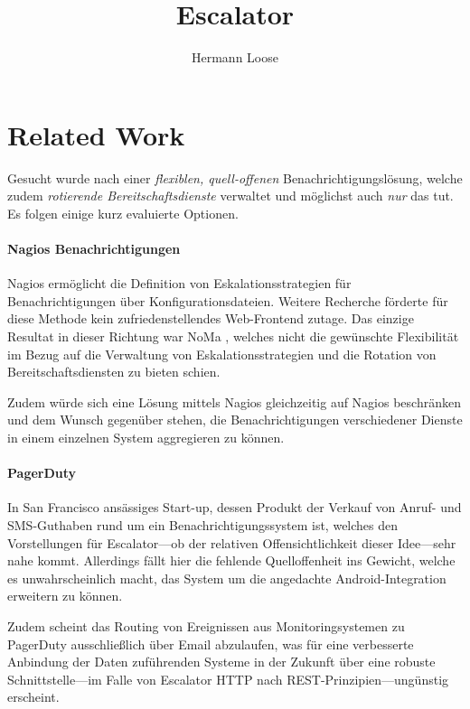 \documentclass[11pt,utf8,notoc,bibnum,german,final]{zihpub}
\title{Escalator}
\author{Hermann Loose}
\begin{document}
\section{Related Work}

Gesucht wurde nach einer \emph{flexiblen, quell-offenen}
Benachrichtigungslösung, welche zudem \emph{rotierende Bereitschaftsdienste}
verwaltet und möglichst auch \emph{nur} das tut. Es folgen einige kurz
evaluierte Optionen.

\paragraph{Nagios Benachrichtigungen \cite{nagios-notifications}}

Nagios ermöglicht die Definition von Eskalationsstrategien für
Benachrichtigungen über Konfigurationsdateien. Weitere Recherche förderte für
diese Methode kein zufriedenstellendes Web-Frontend zutage. Das einzige
Resultat in dieser Richtung war NoMa \cite{noma}, welches nicht die gewünschte
Flexibilität im Bezug auf die Verwaltung von Eskalationsstrategien und die
Rotation von Bereitschaftsdiensten zu bieten schien.

Zudem würde sich eine Lösung mittels Nagios gleichzeitig auf Nagios beschränken
und dem Wunsch gegenüber stehen, die Benachrichtigungen verschiedener Dienste
in einem einzelnen System aggregieren zu können.

\paragraph{PagerDuty \cite{pagerduty}}

In San Francisco ansässiges Start-up, dessen Produkt der Verkauf von Anruf- und
SMS-Guthaben rund um ein Benachrichtigungssystem ist, welches den Vorstellungen
für Escalator—ob der relativen Offensichtlichkeit dieser Idee—sehr nahe kommt.
Allerdings fällt hier die fehlende Quelloffenheit ins Gewicht, welche es
unwahrscheinlich macht, das System um die angedachte Android-Integration
erweitern zu können.

Zudem scheint das Routing von Ereignissen aus Monitoringsystemen zu PagerDuty
ausschließlich über Email abzulaufen, was für eine verbesserte Anbindung der
Daten zuführenden Systeme in der Zukunft über eine robuste Schnittstelle—im
Falle von Escalator HTTP nach REST-Prinzipien—ungünstig erscheint.

\paragraph{}
\end{document}

